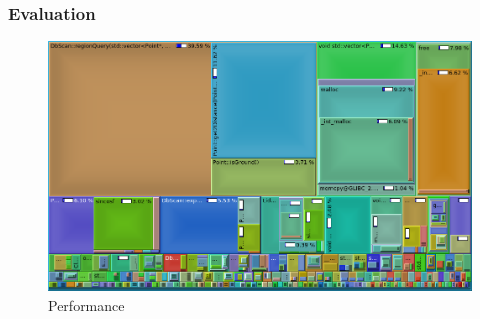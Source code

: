 \documentclass[nosymbols]{beamer}	%
\begin{document}
\begin{frame}
\frametitle{Evaluation}
\begin{figure}[!ht]
\begin{center}
\caption{Performance}
\includegraphics[width=\textwidth,height=0.7\textheight,keepaspectratio]{bilder/call.png}
\end{center}
\end{figure}
\end{frame}

%
\end{document}
